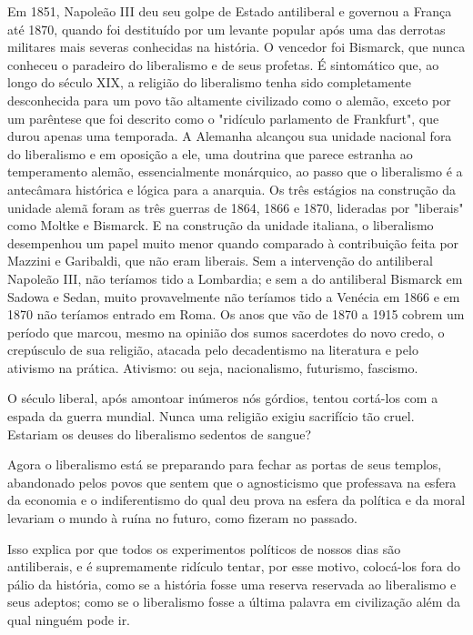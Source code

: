 \documentclass[12pt]{article}
\begin{document}
Em 1851, Napoleão III deu seu golpe de Estado antiliberal e governou a França até 1870, quando foi destituído por um levante popular após uma das derrotas militares mais severas conhecidas na história. O vencedor foi Bismarck, que nunca conheceu o paradeiro do liberalismo e de seus profetas. É sintomático que, ao longo do século XIX, a religião do liberalismo tenha sido completamente desconhecida para um povo tão altamente civilizado como o alemão, exceto por um parêntese que foi descrito como o "ridículo parlamento de Frankfurt", que durou apenas uma temporada. A Alemanha alcançou sua unidade nacional fora do liberalismo e em oposição a ele, uma doutrina que parece estranha ao temperamento alemão, essencialmente monárquico, ao passo que o liberalismo é a antecâmara histórica e lógica para a anarquia. Os três estágios na construção da unidade alemã foram as três guerras de 1864, 1866 e 1870, lideradas por "liberais" como Moltke e Bismarck. E na construção da unidade italiana, o liberalismo desempenhou um papel muito menor quando comparado à contribuição feita por Mazzini e Garibaldi, que não eram liberais. Sem a intervenção do antiliberal Napoleão III, não teríamos tido a Lombardia; e sem a do antiliberal Bismarck em Sadowa e Sedan, muito provavelmente não teríamos tido a Venécia em 1866 e em 1870 não teríamos entrado em Roma. Os anos que vão de 1870 a 1915 cobrem um período que marcou, mesmo na opinião dos sumos sacerdotes do novo credo, o crepúsculo de sua religião, atacada pelo decadentismo na literatura e pelo ativismo na prática. Ativismo: ou seja, nacionalismo, futurismo, fascismo.

O século liberal, após amontoar inúmeros nós górdios, tentou cortá-los com a espada da guerra mundial. Nunca uma religião exigiu sacrifício tão cruel. Estariam os deuses do liberalismo sedentos de sangue?

Agora o liberalismo está se preparando para fechar as portas de seus templos, abandonado pelos povos que sentem que o agnosticismo que professava na esfera da economia e o indiferentismo do qual deu prova na esfera da política e da moral levariam o mundo à ruína no futuro, como fizeram no passado.

Isso explica por que todos os experimentos políticos de nossos dias são antiliberais, e é supremamente ridículo tentar, por esse motivo, colocá-los fora do pálio da história, como se a história fosse uma reserva reservada ao liberalismo e seus adeptos; como se o liberalismo fosse a última palavra em civilização além da qual ninguém pode ir.
\end{document}
